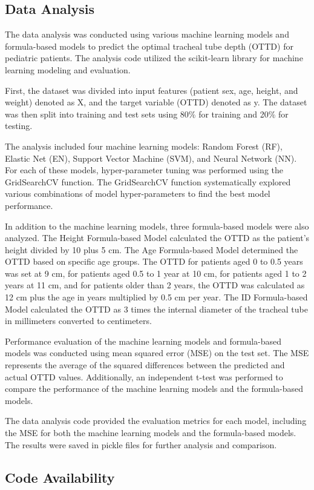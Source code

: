 \documentclass[11pt]{article}
\begin{document}
\subsection*{Data Analysis}
The data analysis was conducted using various machine learning models and formula-based models to predict the optimal tracheal tube depth (OTTD) for pediatric patients. The analysis code utilized the scikit-learn library for machine learning modeling and evaluation.

First, the dataset was divided into input features (patient sex, age, height, and weight) denoted as X, and the target variable (OTTD) denoted as y. The dataset was then split into training and test sets using 80\% for training and 20\% for testing.

The analysis included four machine learning models: Random Forest (RF), Elastic Net (EN), Support Vector Machine (SVM), and Neural Network (NN). For each of these models, hyper-parameter tuning was performed using the GridSearchCV function. The GridSearchCV function systematically explored various combinations of model hyper-parameters to find the best model performance.

In addition to the machine learning models, three formula-based models were also analyzed. The Height Formula-based Model calculated the OTTD as the patient's height divided by 10 plus 5 cm. The Age Formula-based Model determined the OTTD based on specific age groups. The OTTD for patients aged 0 to 0.5 years was set at 9 cm, for patients aged 0.5 to 1 year at 10 cm, for patients aged 1 to 2 years at 11 cm, and for patients older than 2 years, the OTTD was calculated as 12 cm plus the age in years multiplied by 0.5 cm per year. The ID Formula-based Model calculated the OTTD as 3 times the internal diameter of the tracheal tube in millimeters converted to centimeters.

Performance evaluation of the machine learning models and formula-based models was conducted using mean squared error (MSE) on the test set. The MSE represents the average of the squared differences between the predicted and actual OTTD values. Additionally, an independent t-test was performed to compare the performance of the machine learning models and the formula-based models.

The data analysis code provided the evaluation metrics for each model, including the MSE for both the machine learning models and the formula-based models. The results were saved in pickle files for further analysis and comparison.\subsection*{Code Availability}
\end{document}
